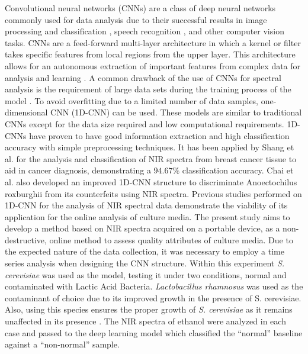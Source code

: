 \documentclass[12pt]{report}
\renewcommand{\cite}{\supercite}
\begin{document}
Convolutional neural networks (CNNs) are a class of deep neural networks commonly used for data analysis due to their successful results in image processing and classification \cite{AnalysisConvolutionalNeuralsharma2018}, speech recognition \cite{SpeechRecognitionUsingalsobhani2021}, and other computer vision tasks. CNNs are a feed-forward multi-layer architecture in which a kernel or filter takes specific features from local regions from the upper layer.  This architecture allows for an autonomous extraction of important features from complex data for analysis and learning \cite{NIRSpectroscopyCombinedshang2023}. A common drawback of the use of CNNs for spectral analysis is the requirement of large data sets during the training process of the model \cite{zhangNearInfraredSpectralCharacteristic2022}. To avoid overfitting due to a limited number of data samples, one-dimensional CNN (1D-CNN) can be used. These models are similar to traditional CNNs except for the data size required and low computational requirements. 1D-CNNs have proven to have good information extraction and high classification accuracy with simple preprocessing techniques. It has been applied by Shang et al.\cite{NIRSpectroscopyCombinedshang2023} for the analysis and classification of NIR spectra from breast cancer tissue to aid in cancer diagnosis, demonstrating a $94.67\%$ classification accuracy. Chai et al.\cite{Improved1DConvolutionalchai2021} also developed an improved 1D-CNN structure to discriminate Anoectochilus roxburghii from its counterfeits using NIR spectra.
Previous studies performed on 1D-CNN for the analysis of NIR spectral data demonstrate the viability of its application for the online analysis of culture media. The present study aims to develop a method based on NIR spectra acquired on a portable device, as a non-destructive, online method to assess quality attributes of culture media. Due to the expected nature of the data collection, it was necessary to employ a time series analysis when designing the CNN structure. Within this experiment \emph{S. cerevisiae} was used as the model, testing it under two conditions, normal and contaminated with Lactic Acid Bacteria. \emph{Lactobacillus rhamnosus} was used as the contaminant of choice due to its improved growth in the presence of S. cerevisiae. Also, using this species ensures the proper growth of \emph{S. cerevisiae} as it remains unaffected in its presence \cite{YeastHumanCoevolutionnenciarini2024}. The NIR spectra of ethanol were analyzed in each case and passed to the deep learning model which classified the “normal” baseline against a “non-normal” sample. 
\end{document}
